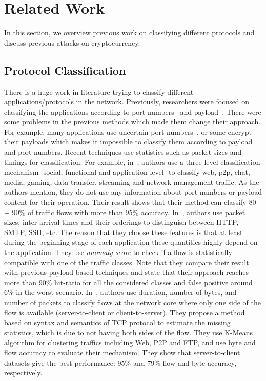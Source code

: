 
\section{Related Work}\label{related}
In this section, we overview previous work on 
classifying different protocols and discuss previous attacks on \bc cryptocurrency.

\subsection{Protocol Classification}
There is a huge work in literature trying to classify different applications/protocols in the network.
Previously, researchers were focused on classifying the applications according
to port numbers~\cite{tcp_p2p, ports, port_madhukar, payload_p2p} and 
payload~\cite{payload_p2p, payload_content, payload_app, payload_moore}. There were some problems 
in the previous methods which made them change their approach. 
For example, many applications use uncertain port numbers~\cite{ports}, or some encrypt their payloads which makes it impossible to classify them  according to payload and port numbers.
Recent techniques use statistics such as packet sizes and timings for classification. For example, in~\cite{blinc}, authors use a three-level classification mechanism -social, functional and application level- to classify web, p2p, chat, media, gaming, data transfer, streaming and network management traffic. As the authors mention, they do not use any information about port
numbers or payload content for their operation. Their result shows that their method can classify $80$ $-$ $90\%$ of traffic flows with more than $95\%$ accuracy. In~\cite{prot_fing}, authors use packet sizes, inter-arrival times and their orderings to distinguish between HTTP, SMTP, SSH, etc. The reason that they choose these features is that at least during the beginning stage of each application these quantities highly depend on the application. They use \textit{anomaly score} to check if a flow is statistically compatible with one of the traffic classes.
Note that they compare their result with previous payload-based techniques and state 
that their approach reaches more than $90\%$ hit-ratio for all the considered classes 
and false positive around $6\%$ in the worst scenario.
In~\cite{web_p2p}, authors use duration, number of bytes, and number
of packets to classify flows at the network core where only one side of the flow is available (server-to-client or client-to-server). 
They propose a method based on syntax and semantics of TCP protocol to estimate the missing 
statistics, which is due to not having both sides of the flow. They use K-Means algorithm for clustering traffics including Web, P2P and FTP, and use byte 
and flow accuracy to evaluate their mechanism. 
They show that server-to-client datasets give the best performance: 95$\%$ and 79$\%$ 
flow and byte accuracy, respectively.

